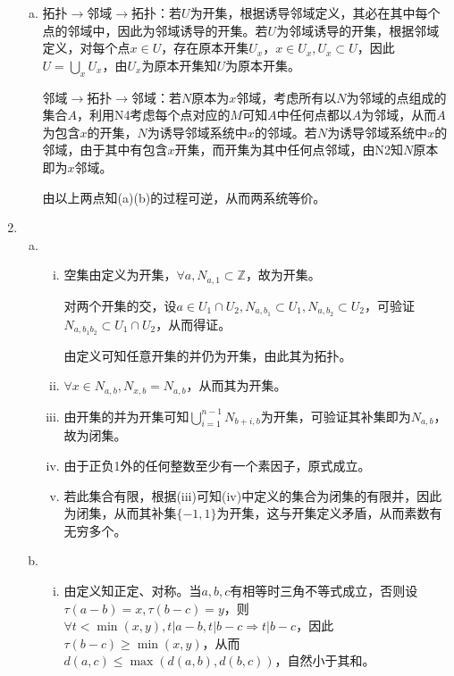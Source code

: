 \documentclass[a4paper,UTF8,fontset=windows]{ctexart}
\begin{document}
\begin{enumerate}[(1)]
\begin{enumerate}[(a)]
    \item
    拓扑$\to$邻域$\to$拓扑：若$U$为开集，根据诱导邻域定义，其必在其中每个点的邻域中，因此为邻域诱导的开集。若$U$为邻域诱导的开集，根据邻域定义，对每个点$x\in U$，存在原本开集$U_x$，$x\in U_x,U_x\subset U$，因此$U=\bigcup_xU_x$，由$U_x$为原本开集知$U$为原本开集。
    
    邻域$\to$拓扑$\to$邻域：若$N$原本为$x$邻域，考虑所有以$N$为邻域的点组成的集合$A$，利用N4考虑每个点对应的$M$可知$A$中任何点都以$A$为邻域，从而$A$为包含$x$的开集，$N$为诱导邻域系统中$x$的邻域。若$N$为诱导邻域系统中$x$的邻域，由于其中有包含$x$开集，而开集为其中任何点邻域，由N2知$N$原本即为$x$邻域。
    
    由以上两点知(a)(b)的过程可逆，从而两系统等价。
    \end{enumerate}
    
    \item
    \begin{enumerate}[(a)]
    \item
    \begin{enumerate}[(i)]
    \item
    空集由定义为开集，$\forall a,N_{a,1}\subset\mathbb{Z}$，故为开集。
    
    对两个开集的交，设$a\in U_1\cap U_2,N_{a,b_1}\subset U_1,N_{a,b_2}\subset U_2$，可验证$N_{a,b_1b_2}\subset U_1\cap U_2$，从而得证。
    
    由定义可知任意开集的并仍为开集，由此其为拓扑。
    
    \item
    $\forall x\in N_{a,b},N_{x,b}=N_{a,b}$，从而其为开集。
    
    \item
    由开集的并为开集可知$\bigcup_{i=1}^{n-1}N_{b+i,b}$为开集，可验证其补集即为$N_{a,b}$，故为闭集。
    
    \item
    由于正负1外的任何整数至少有一个素因子，原式成立。
    
    \item
    若此集合有限，根据(iii)可知(iv)中定义的集合为闭集的有限并，因此为闭集，从而其补集$\{-1,1\}$为开集，这与开集定义矛盾，从而素数有无穷多个。
    \end{enumerate}
    
    \item
    \begin{enumerate}[(i)]
    \item
    由定义知正定、对称。当$a,b,c$有相等时三角不等式成立，否则设$\tau(a-b)=x,\tau(b-c)=y$，则$\forall t<\min(x,y),t|a-b,t|b-c\Rightarrow t|b-c$，因此$\tau(b-c)\ge\min(x,y)$，从而$d(a,c)\le\max(d(a,b),d(b,c))$，自然小于其和。
    

\end{enumerate}
\end{enumerate}
\end{enumerate}
\end{document}
